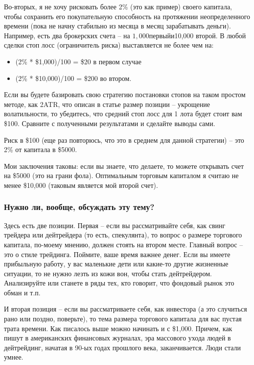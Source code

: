 \documentclass[a5paper]{article}
\begin{document}
Во-вторых, я не хочу рисковать более 2\% (это как пример) своего капитала, чтобы сохранить его покупательную способность на протяжении неопределенного времени (пока не начну стабильно из месяца в месяц зарабатывать деньги). Например, есть два брокерских счета – на $1,000 первый и $10,000 второй. В любой сделки стоп лосс (ограничитель риска) выставляется не более чем на:
\begin{itemize}
\item     (2\% * \$1,000)/100 = \$20 в первом случае
\item     (2\% * \$10,000)/100 = \$200 во втором.
\end{itemize}

Если вы будете базировать свою стратегию постановки стопов на таком простом методе, как 2ATR, что описан в статье размер позиции – укрощение волатильности, то убедитесь, что средний стоп лосс для 1 лота будет стоит вам \$100. Сравните с полученными результатами и сделайте выводы сами.

Риск в \$100 (еще раз повторюсь, что это в среднем для данной стратегии) – это 2\% от капитала в \$5000.

Мои заключения таковы: если вы знаете, что делаете, то можете открывать счет на \$5000 (это на грани фола). Оптимальным торговым капиталом я считаю не менее \$10,000 (таковым является мой второй счет).

\subsubsection{Нужно ли, вообще, обсуждать эту тему?}

Здесь есть две позиции. Первая – если вы рассматривайте себя, как свинг трейдера или дейтрейдера (то есть, спекулянта), то вопрос о размере торгового капитала, по-моему мнению, должен стоять на втором месте. Главный вопрос – это о стиле трейдинга. Поймите, ваше время важнее денег. Если вы имеете прибыльную работу, у вас маленькие дети или какие-то другие жизненные ситуации, то не нужно лезть из кожи вон, чтобы стать дейтрейдером. Анализируйте или станете в ряды тех, кто говорит, что фондовый рынок это обман и т.п.

И вторая позиция – если вы рассматриваете себя, как инвестора (а это случиться рано или поздно, поверьте), то тема размера торгового капитала для вас пустая трата времени. Как писалось выше можно начинать и с \$1,000. Причем, как пишут в американских финансовых журналах, эра массового ухода людей в дейтрейдинг, начатая в 90-ых годах прошлого века, заканчивается. Люди стали умнее.
\end{document}
